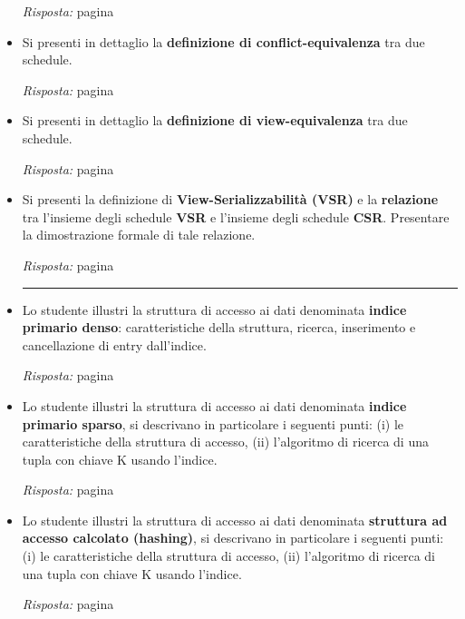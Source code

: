\documentclass[a4paper]{article}
\newcommand{\longline}{\noindent\rule{\textwidth}{0.4pt}}
\begin{document}
\begin{itemize}
		\emph{Risposta:} pagina \pageref{dom: politica di concessione dei lock - locking a due fasi}
		
		\item Si presenti in dettaglio la \textbf{definizione di conflict-equivalenza} tra due schedule.
		
		\emph{Risposta:} pagina \pageref{dom: conflict-equivalenza}
		
		\item Si presenti in dettaglio la \textbf{definizione di view-equivalenza} tra due schedule.
		
		\emph{Risposta:} pagina \pageref{dom: view-equivalenza}
		
		\item Si presenti la definizione di \textbf{View-Serializzabilità (VSR)} e la \textbf{relazione} tra l'insieme degli schedule \textbf{VSR} e l'insieme degli schedule \textbf{CSR}. Presentare la dimostrazione formale di tale relazione.
		
		\emph{Risposta:} pagina \pageref{dom: view-serializzabilità, relazione VSR e CSR + dimostrazione}
		
		\longline
		
		\item Lo studente illustri la struttura di accesso ai dati denominata \textbf{indice primario denso}: caratteristiche della struttura, ricerca, inserimento e cancellazione di entry dall'indice.
		
		\emph{Risposta:} pagina \pageref{dom: indice primario denso}
		
		\item Lo studente illustri la struttura di accesso ai dati denominata \textbf{indice primario sparso}, si descrivano in particolare i seguenti punti: (i) le caratteristiche della struttura di accesso, (ii) l'algoritmo di ricerca di una tupla con chiave K usando l'indice.
		
		\emph{Risposta:} pagina \pageref{dom: indice primario sparso}
		
		\item Lo studente illustri la struttura di accesso ai dati denominata \textbf{struttura ad accesso calcolato (hashing)}, si descrivano in particolare i seguenti punti: (i) le caratteristiche della struttura di accesso, (ii) l'algoritmo di ricerca di una tupla con chiave K usando l'indice.
		
		\emph{Risposta:} pagina \pageref{dom: struttura ad accesso calcolato - hashing}
		

\end{itemize}
\end{document}
